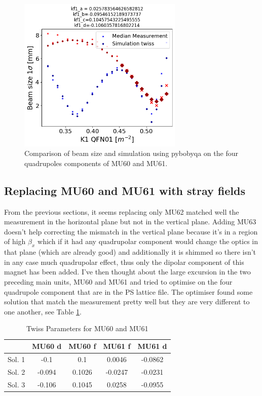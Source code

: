 \begin{figure}[H]
\centering
\includegraphics[width=0.7\textwidth]{02_Simulation/images/comparison_sim_meas_bobyqa.png}
\caption{Comparison of beam size and simulation using pybobyqa on the four quadrupoles components of MU60 and MU61.}
\label{fig:comparison_bobyqa}
\end{figure}

\subsection{Replacing MU60 and MU61 with stray fields}

From the previous sections, it seems replacing only MU62 matched well the measurement in the horizontal plane but not in the vertical plane. Adding MU63 doesn't help correcting the mismatch in the vertical plane because it's in a region of high $\beta_{x}$ which if it had any quadrupolar component would change the optics in that plane (which are already good) and additionally it is shimmed so there isn't in any case much quadrupolar effect, thus only the dipolar component of this magnet has been added. I've then thought about the large excursion in the two preceding main units, MU60 and MU61 and tried to optimise on the four quadrupole component that are in the PS lattice file. The optimiser found some solution that match the measurement pretty well but they are very different to one another, see Table \ref{tab:twiss_parameters_mu60_mu61}.

\begin{table}[ht]
    \centering
    \caption{Twiss Parameters for MU60 and MU61}
    \begin{tabular}{l c c c c}
        \hline
        & \textbf{MU60 d} & \textbf{MU60 f} & \textbf{MU61 f} & \textbf{MU61 d} \\
        \hline
        Sol. 1 & -0.1 & 0.1 & 0.0046 & -0.0862 \\
        Sol. 2 & -0.094 & 0.1026 & -0.0247 & -0.0231 \\
        Sol. 3 & -0.106 & 0.1045 & 0.0258 & -0.0955 \\
        \hline
    \end{tabular}
    \label{tab:twiss_parameters_mu60_mu61}
\end{table}


